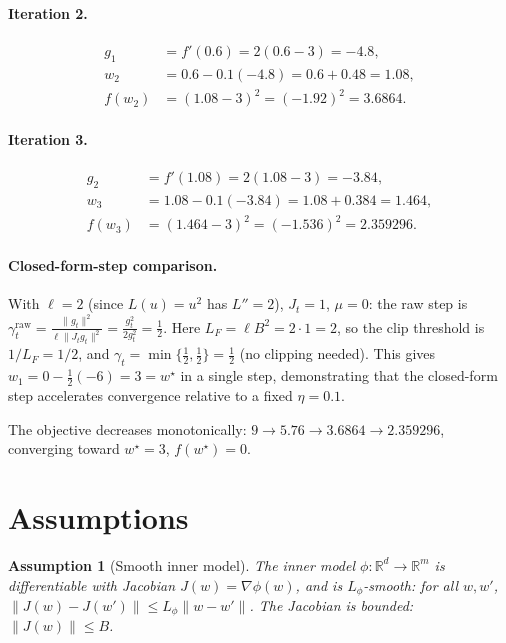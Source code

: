 \documentclass[11pt]{article}
\newtheorem{assumption}{Assumption}
\begin{document}
\paragraph{Iteration 2.}
\begin{align*}
g_1 &= f'(0.6) = 2(0.6-3) = -4.8,\\
w_2 &= 0.6 - 0.1(-4.8) = 0.6 + 0.48 = 1.08,\\
f(w_2) &= (1.08-3)^2 = (-1.92)^2 = 3.6864.
\end{align*}

\paragraph{Iteration 3.}
\begin{align*}
g_2 &= f'(1.08) = 2(1.08-3) = -3.84,\\
w_3 &= 1.08 - 0.1(-3.84) = 1.08 + 0.384 = 1.464,\\
f(w_3) &= (1.464-3)^2 = (-1.536)^2 = 2.359296.
\end{align*}

\paragraph{Closed-form-step comparison.}
With $\ell = 2$ (since $L(u)=u^2$ has $L''=2$), $J_t=1$, $\mu=0$:
the raw step is
$\gamma_t^{\mathrm{raw}} = \frac{\|g_t\|^2}{\ell\|J_t g_t\|^2}
= \frac{g_t^2}{2 g_t^2} = \tfrac12$.
Here $L_F = \ell B^2 = 2\cdot 1 = 2$, so the clip threshold is $1/L_F = 1/2$,
and $\gamma_t = \min\{\tfrac12,\tfrac12\} = \tfrac12$ (no clipping needed).
This gives $w_1 = 0 - \tfrac12(-6) = 3 = w^\star$ in a single step,
demonstrating that the closed-form step accelerates convergence relative to a
fixed $\eta=0.1$.

\medskip
The objective decreases monotonically:
$9 \to 5.76 \to 3.6864 \to 2.359296$, converging toward $w^\star = 3$,
$f(w^\star)=0$.

\section*{Assumptions}

\begin{assumption}[Smooth inner model]\label{as:inner}
The inner model $\phi:\mathbb{R}^d\to\mathbb{R}^m$ is differentiable with Jacobian
$J(w)=\nabla\phi(w)$, and is $L_\phi$-smooth: for all $w,w'$,
$\|J(w)-J(w')\| \le L_\phi \|w-w'\|$. The Jacobian is bounded:
$\|J(w)\| \le B$.
\end{assumption}
\end{document}
